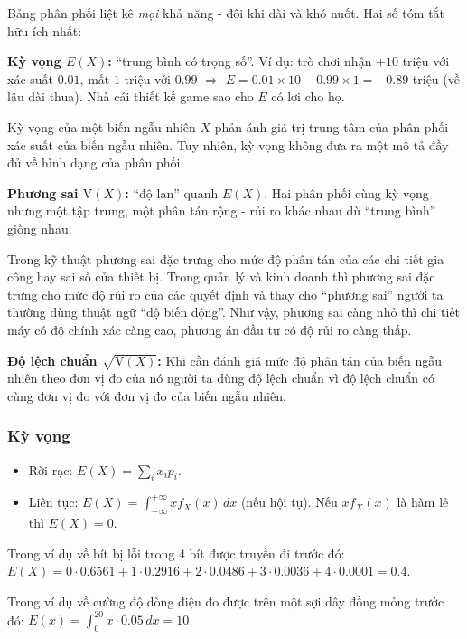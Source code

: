 \documentclass[12pt,a4paper]{article}
\begin{document}
\begin{dongco}
Bảng phân phối liệt kê \emph{mọi} khả năng - đôi khi dài và khó nuốt. Hai số tóm tắt hữu ích nhất:

\textbf{Kỳ vọng $E(X)$:} ``trung bình có trọng số''. Ví dụ: trò chơi nhận $+10$ triệu với xác suất $0.01$, mất $1$ triệu với $0.99$ $\Rightarrow$ $E = 0.01 \times 10 - 0.99 \times 1 = -0.89$ triệu (về lâu dài thua). Nhà cái thiết kế game sao cho $E$ có lợi cho họ.

Kỳ vọng của một biến ngẫu nhiên $X$ phản ánh giá trị trung tâm của phân phối xác suất của biến ngẫu nhiên. Tuy nhiên, kỳ vọng không đưa ra một mô tả đầy đủ về hình dạng của phân phối.

\textbf{Phương sai $\mathrm{V}(X)$:} ``độ lan'' quanh $E(X)$. Hai phân phối cùng kỳ vọng nhưng một tập trung, một phân tán rộng - rủi ro khác nhau dù ``trung bình'' giống nhau.

Trong kỹ thuật phương sai đặc trưng cho mức độ phân tán của các chi tiết gia công hay sai số của thiết bị. Trong quản lý và kinh doanh thì phương sai đặc trưng cho mức độ rủi ro của các quyết định và thay cho “phương sai” người ta thường dùng thuật ngữ “độ biến động”. Như vậy, phương sai càng nhỏ thì chi tiết máy có độ chính xác càng cao, phương án đầu tư có độ rủi ro càng thấp.

\textbf{Độ lệch chuẩn $\sqrt{\mathrm{V}(X)}$:} Khi cần đánh giá mức độ phân tán của biến ngẫu nhiên theo đơn vị đo của nó người ta dùng độ lệch chuẩn vì độ lệch chuẩn có cùng đơn vị đo với đơn vị đo của biến ngẫu nhiên.
\end{dongco}

\subsubsection{Kỳ vọng}

\begin{dinhnghia}[title={Kỳ vọng $E(X)$}]
  \begin{itemize}
    \item Rời rạc: $E(X) = \displaystyle\sum_i x_i p_i$.
    \item Liên tục: $E(X) = \displaystyle\int_{-\infty}^{+\infty} x f_X(x)\,dx$ (nếu hội tụ). Nếu $x f_X(x)$ là hàm lẻ thì $E(X) = 0$.
  \end{itemize}
\end{dinhnghia}

\begin{vidu}
Trong ví dụ về bít bị lỗi trong 4 bít được truyền đi trước đó: $E(X) = 0 \cdot 0.6561 + 1 \cdot 0.2916 + 2 \cdot 0.0486 + 3 \cdot 0.0036 + 4 \cdot 0.0001 = 0.4$.

Trong ví dụ về cường độ dòng điện đo được trên một sợi dây đồng mỏng trước đó: $E(x) = \displaystyle\int_{0}^{20} x \cdot 0.05\,dx = 10$.
\end{vidu}
\end{document}

